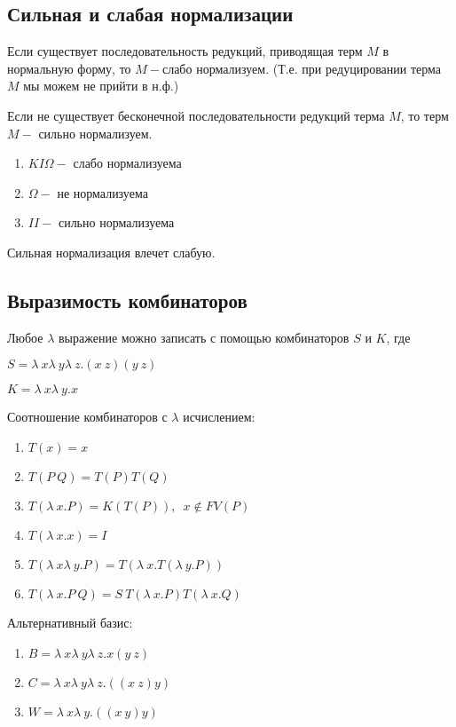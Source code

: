 \documentclass[12pt, a4paper]{article}
\begin{document}
	\subsection{Сильная и слабая нормализации}
	\begin{definition}Если существует последовательность редукций, приводящая терм $M$ в нормальную форму, то $M-$слабо нормализуем. (Т.е. при редуцировании терма $M$ мы можем не прийти в н.ф.)\end{definition} 
	\begin{definition}Если не существует бесконечной последовательности редукций терма $M$, то терм $M-$ сильно нормализуем.\end{definition} 
	 \begin{statement}
	 \end{statement}
	 \begin{enumerate}
	 	\item $KI\Omega-$ слабо нормализуема
	 	\item $\Omega-$ не нормализуема
	 	\item $II-$ сильно нормализуема
	 \end{enumerate}
	 \begin{lemma}Сильная нормализация влечет слабую.
	 \end{lemma}
	 \subsection{Выразимость комбинаторов}
	 \begin{statement}Любое $\lambda$ выражение можно записать с помощью комбинаторов $S$ и $K$, где\end{statement}
	 $S=\lambda\:x\lambda\:y\lambda\:z.(x\:z)(y\:z)$\par 
	 $K=\lambda\:x\lambda\:y.x$\par 
	\begin{statement}Соотношение комбинаторов с $\lambda$ исчислением:\end{statement}
	\begin{enumerate}
		\item $T(x)=x$
		\item $T(P\:Q)=T(P)T(Q)$
		\item $T(\lambda\:x.P)=K(T(P)),\enspace x\not\in FV(P)$
		\item $T(\lambda\:x.x)=I$
		\item $T(\lambda\:x\lambda\:y.P)=T(\lambda\:x.T(\lambda\:y.P))$
		\item $T(\lambda\:x.P\:Q)=S\:T(\lambda\:x.P)T(\lambda\:x.Q)$
	\end{enumerate}		
	 \begin{statement}Альтернативный базис:\end{statement}
	 \begin{enumerate}
		\item $B=\lambda\:x\lambda\:y\lambda\:z.x(y\:z)$
		\item $C=\lambda\:x\lambda\:y\lambda\:z.((x\:z)y)$
		\item $W=\lambda\:x\lambda\:y.((x\:y)y)$
	 \end{enumerate}
\end{document}
